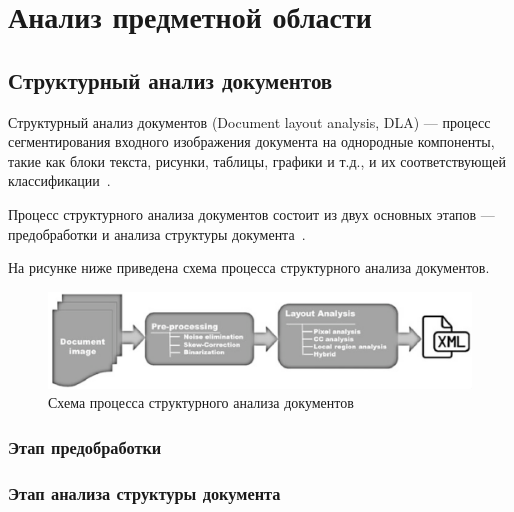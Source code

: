 \section{Анализ предметной области}

 

\subsection{Структурный анализ документов}

Структурный анализ документов (Document layout analysis, DLA) --- процесс сегментирования входного изображения документа на однородные компоненты, такие как блоки текста, рисунки, таблицы, графики и т.д., и их соответствующей классификации~\cite{tnt}.

Процесс структурного анализа документов состоит из двух основных этапов --- предобработки и анализа структуры документа~\cite{dla-survey, dla-book}.

На рисунке ниже приведена схема процесса структурного анализа документов.

\begin{figure}[H]
	\centering
	\includegraphics[width=\textwidth]{img/typical-dla-system.png}
	\caption{Схема процесса структурного анализа документов~\cite{dla-book}}
	\label{fig:}
\end{figure}

\subsubsection{Этап предобработки}

\subsubsection{Этап анализа структуры документа}



